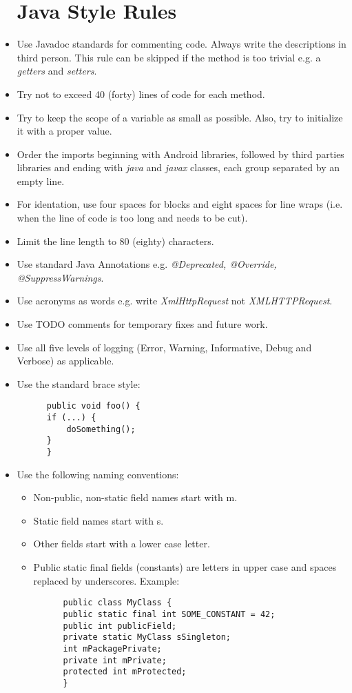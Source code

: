 \begin{itemize}
  \section{Java Style Rules}
  \item Use Javadoc standards for commenting code. Always write the descriptions in third person. This rule can be skipped if the method is too trivial e.g. a \textit{getters} and \textit{setters}.
  \item Try not to exceed 40 (forty) lines of code for each method.
  \item Try to keep the scope of a variable as small as possible. Also, try to initialize it with a proper value. 
  \item Order the imports beginning with Android libraries, followed by third parties libraries and ending with \textit{java} and \textit{javax} classes, each group separated by an empty line.
  \item For identation, use four spaces for blocks and eight spaces for line wraps (i.e. when the line of code is too long and needs to be cut).
  \item Limit the line length to 80 (eighty) characters. 
  \item Use standard Java Annotations e.g. \textit{@Deprecated, @Override, @SuppressWarnings}.
  \item Use acronyms as words e.g. write \textit{XmlHttpRequest} not \textit{XMLHTTPRequest}.
  \item Use TODO comments for temporary fixes and future work.
  \item Use all five levels of logging (Error, Warning, Informative, Debug and Verbose) as applicable.
  \item Use the standard brace style: 
  \begin{lstlisting}
      public void foo() {
	  if (...) {
	      doSomething();
	  }
      }
  \end{lstlisting}
  \item Use the following naming conventions:
  \begin{itemize}
    \item Non-public, non-static field names start with m.
    \item Static field names start with s.
    \item Other fields start with a lower case letter.
    \item Public static final fields (constants) are letters in upper case and spaces replaced by underscores.
    Example:
      \begin{lstlisting}
      public class MyClass {
	  public static final int SOME_CONSTANT = 42;
	  public int publicField;
	  private static MyClass sSingleton;
	  int mPackagePrivate;
	  private int mPrivate;
	  protected int mProtected;
      }
      \end{lstlisting}
    \end{itemize}
  \end{itemize}
